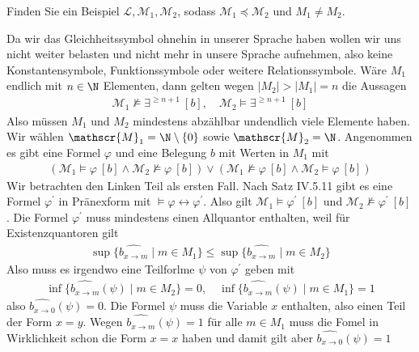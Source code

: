 
\begin{exercise}[143]
Finden Sie ein Beispiel $\mathscr{L},\mathscr{M}_1,\mathscr{M}_2$, sodass
$\mathscr{M}_1 \preccurlyeq \mathscr{M}_2$ und $M_1 \neq M_2$.
\end{exercise}

\begin{solution}
	Da wir das Gleichheitssymbol ohnehin in unserer Sprache haben wollen wir uns nicht weiter belasten und nicht mehr in unsere Sprache aufnehmen, also keine Konstantensymbole, Funktionssymbole oder weitere Relationssymbole. Wäre $M_1$ endlich mit $n \in \N$ Elementen, dann gelten wegen $ |M_2| > |M_1| = n$ die Aussagen
	\begin{align*}
	\mathscr{M}_1 \nvDash \exists^{\geq n + 1} \ [b], \quad \mathscr{M}_2 \vDash \exists^{\geq n + 1} \ [b]
	\end{align*}
	 Also müssen $M_1$ und $M_2$ mindestens abzählbar undendlich viele Elemente haben. Wir wählen $\mathscr{M}_1 = \N \setminus \{0\}$ sowie $\mathscr{M}_2 = \N$. Angenommen es gibt eine Formel $\varphi$ und eine Belegung $b$ mit Werten in $M_1$ mit
	 \begin{align*}
	 (\mathscr{M}_1 \vDash \varphi \ [b] \land \mathscr{M}_2 \nvDash \varphi \ [b]) \lor (\mathscr{M}_1 \nvDash \varphi \ [b] \land \mathscr{M}_2 \vDash \varphi \ [b])
	 \end{align*}
	 Wir betrachten den Linken Teil als ersten Fall. Nach Satz IV.5.11 gibt es eine Formel $\varphi^\prime$ in Pränexform mit $\vDash \varphi \leftrightarrow \varphi^\prime$. Also gilt $\mathscr{M}_1 \vDash \varphi^\prime \ [b]$ und $\mathscr{M}_2 \nvDash \varphi^\prime \ [b]$. Die Formel $\varphi^\prime$ muss mindestens einen Allquantor enthalten, weil für Existenzquantoren gilt 
	 \begin{align*}
	 \sup\{\widehat{b_{x \to m}} \mid m \in M_1 \} \leq \sup\{\widehat{b_{x \to m}} \mid m \in M_2 \}
	 \end{align*}
	 Also muss es irgendwo eine Teilforlme $\psi$ von $\varphi^\prime$ geben mit
	 \begin{align*}
	 \inf\{\widehat{b_{x \to m}}(\psi) \mid m \in M_2\} = 0, \quad \inf\{\widehat{b_{x \to m}}(\psi) \mid m \in M_1\} = 1
	 \end{align*}
	 also $\widehat{b_{x \to 0}}(\psi) = 0$. Die Formel $\psi$ muss die Variable $x$ enthalten, also einen Teil der Form $x = y$. Wegen $\widehat{b_{x \to m}}(\psi) = 1$ für alle $m \in M_1$ muss die Fomel in Wirklichkeit schon die Form $x = x$ haben und damit gilt aber $\widehat{b_{x \to 0}}(\psi) = 1$
\end{solution}
